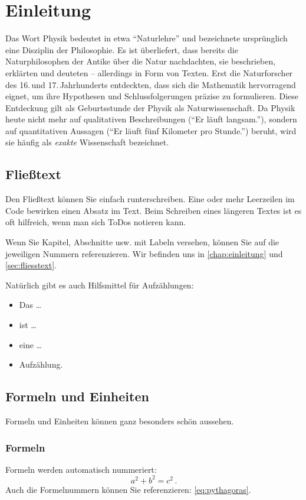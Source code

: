 \chapter{Einleitung}
	\label{chap:einleitung}
	
	Das Wort Physik bedeutet in etwa \enquote{Naturlehre} und bezeichnete ursprünglich eine Disziplin der Philosophie. Es ist überliefert, dass bereits die Naturphilosophen der Antike über die Natur nachdachten, sie beschrieben, erklärten und deuteten -- allerdings in Form von Texten. Erst die Naturforscher des 16.\,und 17.\,Jahrhunderts entdeckten, dass sich die Mathematik hervorragend eignet, um ihre Hypothesen und Schlussfolgerungen präzise zu formulieren. Diese Entdeckung gilt als Geburtsstunde der Physik als Naturwissenschaft. Da Physik heute nicht mehr auf qualitativen Beschreibungen (\zB \enquote{Er läuft langsam.}), sondern auf quantitativen Aussagen (\zB \enquote{Er läuft fünf Kilometer pro Stunde.}) beruht, wird sie häufig als \emph{exakte} Wissenschaft bezeichnet. %
	
	\section{Fließtext}
		\label{sec:fliesstext}
		Den Fließtext können Sie einfach runterschreiben. Eine oder mehr Leerzeilen im Code bewirken einen Absatz im Text. Beim Schreiben eines längeren Textes ist es oft hilfreich, wenn man sich ToDos  notieren kann. %
		
		Wenn Sie Kapitel, Abschnitte usw. mit Labeln versehen, können Sie auf die jeweiligen Nummern referenzieren. Wir befinden uns \zB in \autoref{chap:einleitung} und \autoref{sec:fliesstext}. %
		
		Natürlich gibt es auch Hilfsmittel für Aufzählungen: %
		\begin{itemize}
			\item Das \dots
			\item ist \dots
			\item eine \dots
			\item Aufzählung.
		\end{itemize}
			
	\section{Formeln und Einheiten}
		Formeln und Einheiten können ganz besonders schön aussehen. \textcolor{gray}{\lipsum[1]} %
				
		\subsection{Formeln}
			Formeln werden automatisch nummeriert:
			\begin{equation}
				\label{eq:pythagoras}
				a^2 + b^2 = c^2 \,.
			\end{equation}
			Auch die Formelnummern können Sie referenzieren: \eqref{eq:pythagoras}.
			
